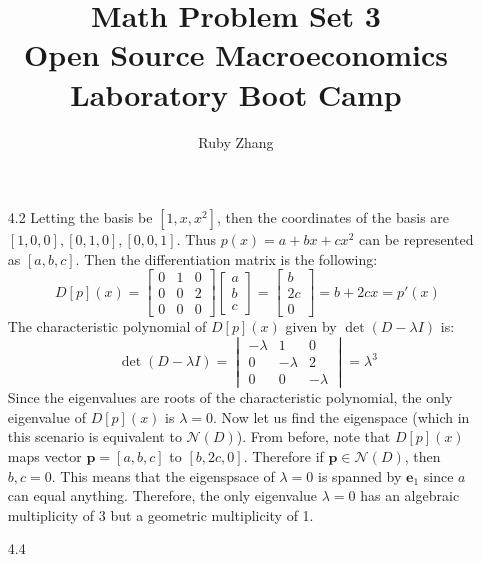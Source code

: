 \documentclass[letterpaper,12pt]{article}
\theoremstyle{definition}
\begin{document}
\title{Math Problem Set 3 \\
Open Source Macroeconomics Laboratory Boot Camp}
\author{Ruby Zhang}
\maketitle

\begin{enumerate}
  \item[4.2]
  Letting the basis be $[1,x,x^2]$, then the coordinates of the basis are $[1,0,0], [0,1,0], [0,0,1]$. Thus $p(x) = a + bx + cx^2$ can be represented as $[a, b, c]$. Then the differentiation matrix is the following:
        \[
          D[p](x) =
          \begin{bmatrix}
            0 & 1 & 0 \\
            0 & 0 & 2 \\
            0 & 0 & 0
          \end{bmatrix}
          \begin{bmatrix}
            a \\
            b \\
            c
          \end{bmatrix}
          =
          \begin{bmatrix}
            b \\
            2c \\
            0
          \end{bmatrix}
          = b + 2cx = p'(x)
        \]
    The characteristic polynomial of $D[p](x)$ given by $\det(D-\lambda I)$ is:
    \[
      \det(D-\lambda I) =
      \begin{vmatrix}
        -\lambda & 1 & 0 \\
        0 & -\lambda & 2 \\
        0 & 0 & -\lambda
      \end{vmatrix}
      = \lambda^3
    \]
    Since the eigenvalues are roots of the characteristic polynomial, the only eigenvalue of $D[p](x)$ is $\lambda=0$. Now let us find the eigenspace (which in this scenario is equivalent to $\mathscr{N}(D)$). From before, note that $D[p](x)$ maps vector $\mathbf{p}=[a,b,c]$ to $[b,2c,0]$. Therefore if $\mathbf{p} \in \mathscr{N}(D)$, then $b, c = 0$. This means that the eigenspsace of $\lambda=0$ is spanned by $\mathbf{e}_1$ since $a$ can equal anything.
    Therefore, the only eigenvalue $\lambda=0$ has an algebraic multiplicity of 3 but a geometric multiplicity of 1.
  \item[4.4]

\end{enumerate}
\end{document}
